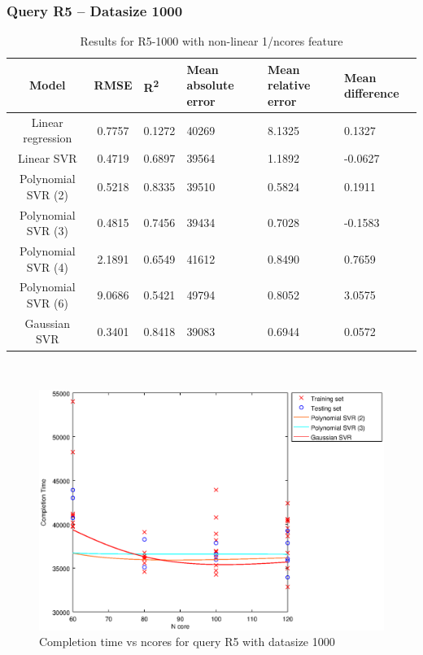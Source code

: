\documentclass[a4paper,11pt]{article}
\begin{document}
\newpage
\subsubsection{Query R5 -- Datasize 1000}
\begin{table}[H]
	\centering
	\begin{adjustbox}{center}
		\begin{tabular}{c | c M{1.2cm} M{2.5cm} M{2.5cm} M{1.8cm}}
			Model & RMSE & R\textsuperscript{2} & Mean absolute error & Mean relative error & Mean difference \tabularnewline
			\hline
			Linear regression & 0.7757 & 0.1272 &  40269 & 8.1325 & 0.1327 \\
			Linear SVR & 0.4719 & 0.6897 &  39564 & 1.1892 & -0.0627 \\
			Polynomial SVR (2) & 0.5218 & 0.8335 &  39510 & 0.5824 & 0.1911 \\
			Polynomial SVR (3) & 0.4815 & 0.7456 &  39434 & 0.7028 & -0.1583 \\
			Polynomial SVR (4) & 2.1891 & 0.6549 &  41612 & 0.8490 & 0.7659 \\
			Polynomial SVR (6) & 9.0686 & 0.5421 &  49794 & 0.8052 & 3.0575 \\
			Gaussian SVR & 0.3401 & 0.8418 &  39083 & 0.6944 & 0.0572 \\
		\end{tabular}
	\end{adjustbox}
	\\
	\caption{Results for R5-1000 with non-linear 1/ncores feature}
	\label{table_R5_prediction_all}
\end{table}

\begin {figure}[hbtp]
\centering
\includegraphics[width=\textwidth]{output/R5_1000_1_OVER_NCORES/plot_R5_1000_bestmodels.eps}
\caption {Completion time vs ncores for query R5 with datasize 1000}
\end {figure}
\end{document}
